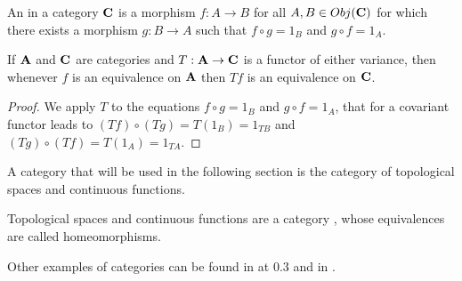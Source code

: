\documentclass[../1.tex]{subfiles}
\begin{document}
    \begin{defn}
        An  in a category $\textbf{C}$ is a morphism $f : A \to B$ for all $A,B \in Obj(\textbf{C})$ for which there exists a morphism $g : B \to A$ such that
        $ f \circ g = 1_B$ and $ g \circ f = 1_A$.
    \end{defn}

    \begin{thm}
        If $\textbf{A}$ and $\textbf{C}$ are categories and $T : \textbf{A} \to \textbf{C}$ is a functor of either variance, then whenever $f$ is 
        an equivalence on $\textbf{A}$ then $Tf$ is an equivalence on $\textbf{C}$.
    \end{thm}
    \begin{proof}
        We apply $T$ to the equations $ f \circ g = 1_B$ and $ g \circ f = 1_A$, that for a covariant functor leads to 
        $(Tf) \circ (Tg) = T(1_B) = 1_{TB}$ and $(Tg) \circ (Tf) = T(1_A) = 1_{TA}$.
    \end{proof}

    A category that will be used in the following section is the category of topological spaces and continuous functions.

    \begin{prop}
        Topological spaces and continuous functions are a category , whose equivalences are called homeomorphisms.
    \end{prop}

    Other examples of categories can be found in \cite{rotman} at 0.3 and in \cite{mclane}.
\end{document}
